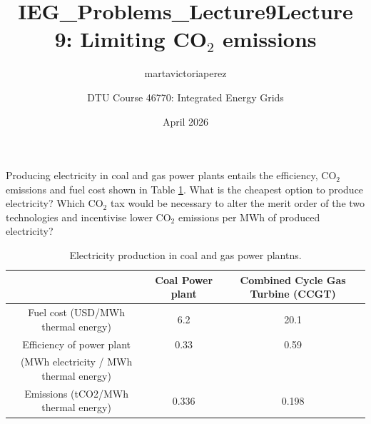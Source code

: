 \documentclass[10pt]{article}
\title{IEG_Problems_Lecture9}
\author{martavictoriaperez }
\date{April 2026}
\newenvironment{problem}[2][Problem]{\begin{trivlist}
\item[\hskip \labelsep {\bfseries #1}\hskip \labelsep {\bfseries #2.}]}{\end{trivlist}}
\begin{document}
 
\title{\textbf{Lecture 9: Limiting CO$_2$ emissions}}
\author{
DTU Course 46770: Integrated Energy Grids }
\maketitle

\begin{problem}{9.1}
Producing electricity in coal and gas power plants entails the efficiency, CO$_2$ emissions and fuel cost shown in Table \ref{Tab_coal_gas}. What is the cheapest option to produce electricity? Which CO$_2$ tax would be necessary to alter the merit order of the two technologies and incentivise lower CO$_2$ emissions per MWh of produced electricity?

\begin{table}[h]
    \centering
    \begin{tabular}{|c|c|c|}
        \hline
        & Coal Power plant	&Combined Cycle Gas Turbine (CCGT) \\ \hline
Fuel cost (USD/MWh thermal energy)	& 6.2	& 20.1 \\
Efficiency of power plant &	0.33	& 0.59  \\
(MWh electricity / MWh thermal energy) &	& \\
Emissions (tCO2/MWh thermal energy)	& 0.336	& 0.198 \\
\hline
    \end{tabular}
    \caption{Electricity production in coal and gas power plantns.}
    \label{Tab_coal_gas}
\end{table}
\end{problem}

\
\end{document}
